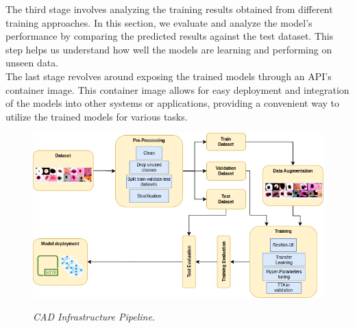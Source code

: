 The third stage involves analyzing the training results obtained from different
training approaches. In this section, we evaluate and analyze the model's
performance by comparing the predicted results against the test dataset. This
step helps us understand how well the models are learning and performing on
unseen data. \\

The last stage revolves around exposing the trained models through an API's
container image. This container image allows for easy deployment and
integration of the models into other systems or applications, providing a
convenient way to utilize the trained models for various tasks. \\


\begin{figure}[H]
  \centering
  \includegraphics[width=\textwidth]{imatges/methodological_contribution/Pipeline.drawio.png}
  \caption[CAD Infrastructure Pipeline]{\textit{CAD Infrastructure Pipeline. }}
  {\label{fig:cad-infrastructure-training-system}}
\end{figure}
